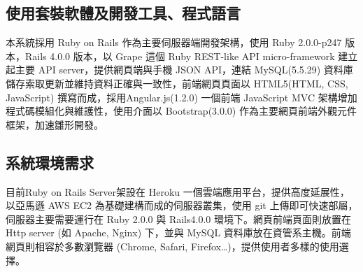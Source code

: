 \documentclass[11pt]{article}
\begin{document}
\subsection{使用套裝軟體及開發工具、程式語言}
本系統採用 Ruby on Rails 作為主要伺服器端開發架構，使用 Ruby 2.0.0-p247 版本，Rails 4.0.0 版本，以 Grape 這個 Ruby REST-like API micro-framework 建立起主要 API server，提供網頁端與手機 JSON API，連結 MySQL(5.5.29) 資料庫儲存索取更新並維持資料正確與一致性，前端網頁頁面以 HTML5(HTML, CSS, JavaScript) 撰寫而成，採用Angular.js(1.2.0) 一個前端 JavaScript MVC 架構增加程式碼模組化與維護性，使用介面以 Bootstrap(3.0.0) 作為主要網頁前端外觀元件框架，加速雛形開發。
\subsection{系統環境需求}
目前Ruby on Rails Server架設在 Heroku 一個雲端應用平台，提供高度延展性，以亞馬遜 AWS EC2 為基礎建構而成的伺服器叢集，使用 git 上傳即可快速部屬，伺服器主要需要運行在 Ruby 2.0.0 與 Rails4.0.0 環境下。網頁前端頁面則放置在 Http server (如 Apache, Nginx) 下，並與 MySQL 資料庫放在資管系主機。前端網頁則相容於多數瀏覽器 (Chrome, Safari, Firefox…)，提供使用者多樣的使用選擇。
\end{document}
